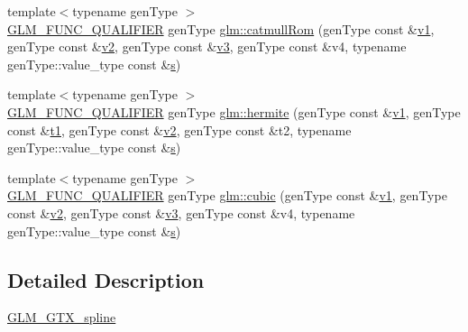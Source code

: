 \begin{DoxyCompactItemize}
\item 
{\footnotesize template$<$typename gen\+Type $>$ }\\\hyperlink{setup_8hpp_a33fdea6f91c5f834105f7415e2a64407}{G\+L\+M\+\_\+\+F\+U\+N\+C\+\_\+\+Q\+U\+A\+L\+I\+F\+I\+ER} gen\+Type \hyperlink{group__gtx__spline_ga8119c04f8210fd0d292757565cd6918d}{glm\+::catmull\+Rom} (gen\+Type const \&\hyperlink{_s_d_l__opengl__glext_8h_a435c176a02c061b43e19bdf7c86cceae}{v1}, gen\+Type const \&\hyperlink{_s_d_l__opengl__glext_8h_a0928f6d0f0f794ba000a21dfae422136}{v2}, gen\+Type const \&\hyperlink{_s_d_l__opengl__glext_8h_acc806b31cbf466ceba6555983d8b814d}{v3}, gen\+Type const \&v4, typename gen\+Type\+::value\+\_\+type const \&\hyperlink{_s_d_l__opengl_8h_a4af680a6c683f88ed67b76f207f2e6e4}{s})
\item 
{\footnotesize template$<$typename gen\+Type $>$ }\\\hyperlink{setup_8hpp_a33fdea6f91c5f834105f7415e2a64407}{G\+L\+M\+\_\+\+F\+U\+N\+C\+\_\+\+Q\+U\+A\+L\+I\+F\+I\+ER} gen\+Type \hyperlink{group__gtx__spline_gaa69e143f6374d32f934a8edeaa50bac9}{glm\+::hermite} (gen\+Type const \&\hyperlink{_s_d_l__opengl__glext_8h_a435c176a02c061b43e19bdf7c86cceae}{v1}, gen\+Type const \&\hyperlink{_s_d_l__opengl__glext_8h_af48031a37b713afa3b0d0d7d29653d7c}{t1}, gen\+Type const \&\hyperlink{_s_d_l__opengl__glext_8h_a0928f6d0f0f794ba000a21dfae422136}{v2}, gen\+Type const \&t2, typename gen\+Type\+::value\+\_\+type const \&\hyperlink{_s_d_l__opengl_8h_a4af680a6c683f88ed67b76f207f2e6e4}{s})
\item 
{\footnotesize template$<$typename gen\+Type $>$ }\\\hyperlink{setup_8hpp_a33fdea6f91c5f834105f7415e2a64407}{G\+L\+M\+\_\+\+F\+U\+N\+C\+\_\+\+Q\+U\+A\+L\+I\+F\+I\+ER} gen\+Type \hyperlink{group__gtx__spline_ga6b867eb52e2fc933d2e0bf26aabc9a70}{glm\+::cubic} (gen\+Type const \&\hyperlink{_s_d_l__opengl__glext_8h_a435c176a02c061b43e19bdf7c86cceae}{v1}, gen\+Type const \&\hyperlink{_s_d_l__opengl__glext_8h_a0928f6d0f0f794ba000a21dfae422136}{v2}, gen\+Type const \&\hyperlink{_s_d_l__opengl__glext_8h_acc806b31cbf466ceba6555983d8b814d}{v3}, gen\+Type const \&v4, typename gen\+Type\+::value\+\_\+type const \&\hyperlink{_s_d_l__opengl_8h_a4af680a6c683f88ed67b76f207f2e6e4}{s})
\end{DoxyCompactItemize}


\subsection{Detailed Description}
\hyperlink{group__gtx__spline}{G\+L\+M\+\_\+\+G\+T\+X\+\_\+spline} 